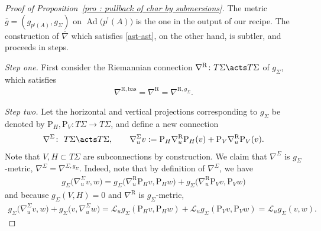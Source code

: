\begin{proof}[Proof of Proposition~\ref{pro : pullback of char by submersions}]
 The metric $\overline{g}=(g_{p^!(A)},g_{\Sigma})$ on $\operatorname{Ad}\big(p^!(A)\big)$ is the one in the output of our recipe. The construction of $\overline{\nabla}$ which satisfies \eqref{ast-ast}, on the other hand, is subtler, and proceeds in steps.

{\it Step one.} First consider the Riemannian connection $\nabla^{\mathrm{R}}\colon T\Sigma \acts T\Sigma$ of $g_{\Sigma}$, which satisfies
 \begin{gather*}
 \nabla^{\mathrm{R},\mathrm{bas}} = \nabla^{\mathrm{R}} = \nabla^{\mathrm{R},g_{\Sigma}}.
 \end{gather*}

{\it Step two.} Let the horizontal and vertical projections corresponding to $g_{\Sigma}$ be denoted by $\mathrm{P}_H,\mathrm{P}_V\colon T\Sigma \to T\Sigma $, and define a new connection
 \begin{gather*}
 \nabla^{\Sigma}\colon \ T\Sigma \acts T\Sigma, \qquad \nabla^{\Sigma}_uv:=\mathrm{P}_H\nabla^{\mathrm{R}}_u\mathrm{P}_H(v) + \mathrm{P}_V\nabla^{\mathrm{R}}_u\mathrm{P}_V(v).
 \end{gather*}Note that $V,H \subset T\Sigma$ are subconnections by construction. We claim that $\nabla^{\Sigma}$ is $g_{\Sigma}$-metric, $\nabla^{\Sigma} = \nabla^{\Sigma,g_{\Sigma}}$. Indeed, note that by definition of $\nabla^{\Sigma}$, we have
 \begin{gather*}
 g_{\Sigma}\big(\nabla^{\Sigma}_uv,w\big) = g_{\Sigma}\big(\nabla^{\mathrm{R}}_u\mathrm{P}_Hv,\mathrm{P}_Hw\big) + g_{\Sigma}\big(\nabla^{\mathrm{R}}_u\mathrm{P}_Vv,\mathrm{P}_Vw\big)
 \end{gather*}and because $g_{\Sigma}(V,H)=0$ and $\nabla^{\mathrm{R}}$ is $g_{\Sigma}$-metric,
 \begin{gather*}
 g_{\Sigma}\big(\nabla^{\Sigma}_uv,w\big) + g_{\Sigma}\big(v,\nabla^{\Sigma}_uw\big) = \mathscr{L}_ug_{\Sigma}(\mathrm{P}_Hv,\mathrm{P}_Hw) + \mathscr{L}_ug_{\Sigma}(\mathrm{P}_Vv,\mathrm{P}_Vw) = \mathscr{L}_ug_{\Sigma}(v,w).
 \end{gather*}


\end{proof}
